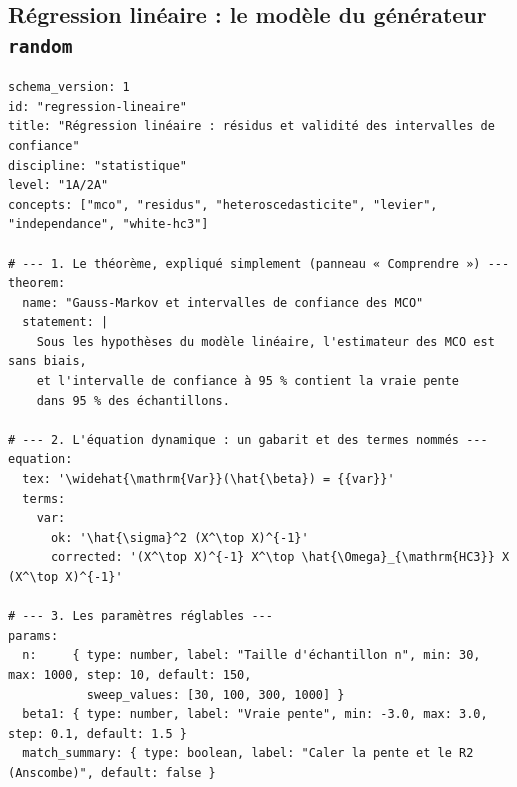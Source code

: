 \documentclass[11pt,a4paper]{article}
\begin{document}
\begin{appendices}
\subsection{Régression linéaire : le modèle du générateur \texttt{random}}\label{ann:yaml-random}
\begin{lstlisting}[caption={Fichier de référence \texttt{experiments/regression\_lineaire.yaml}.}]
schema_version: 1
id: "regression-lineaire"
title: "Régression linéaire : résidus et validité des intervalles de confiance"
discipline: "statistique"
level: "1A/2A"
concepts: ["mco", "residus", "heteroscedasticite", "levier", "independance", "white-hc3"]

# --- 1. Le théorème, expliqué simplement (panneau « Comprendre ») ---
theorem:
  name: "Gauss-Markov et intervalles de confiance des MCO"
  statement: |
    Sous les hypothèses du modèle linéaire, l'estimateur des MCO est sans biais,
    et l'intervalle de confiance à 95 % contient la vraie pente
    dans 95 % des échantillons.

# --- 2. L'équation dynamique : un gabarit et des termes nommés ---
equation:
  tex: '\widehat{\mathrm{Var}}(\hat{\beta}) = {{var}}'
  terms:
    var:
      ok: '\hat{\sigma}^2 (X^\top X)^{-1}'
      corrected: '(X^\top X)^{-1} X^\top \hat{\Omega}_{\mathrm{HC3}} X (X^\top X)^{-1}'

# --- 3. Les paramètres réglables ---
params:
  n:     { type: number, label: "Taille d'échantillon n", min: 30, max: 1000, step: 10, default: 150,
           sweep_values: [30, 100, 300, 1000] }
  beta1: { type: number, label: "Vraie pente", min: -3.0, max: 3.0, step: 0.1, default: 1.5 }
  match_summary: { type: boolean, label: "Caler la pente et le R2 (Anscombe)", default: false }


\end{lstlisting}
\end{appendices}
\end{document}
